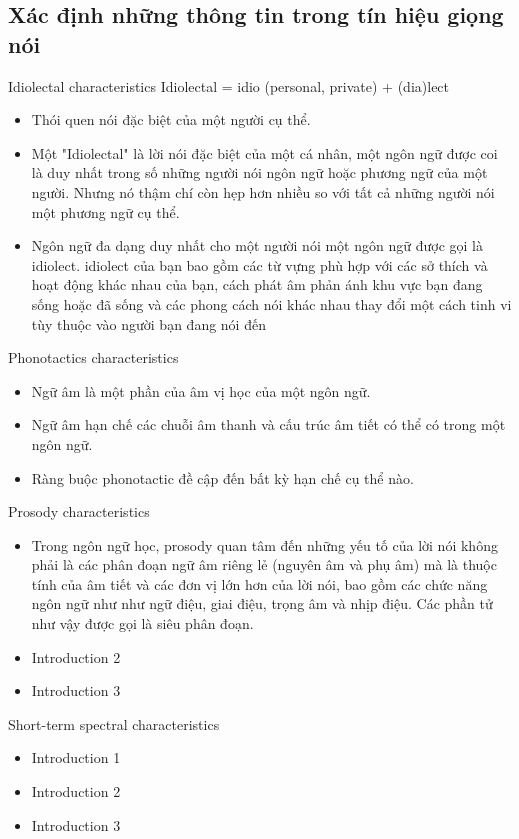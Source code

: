 \documentclass[11pt]{beamer}
\begin{document}
\subsection{Xác định những thông tin trong tín hiệu giọng nói}
\begin{frame}{Idiolectal characteristics}
	Idiolectal = idio (personal, private) + (dia)lect
	\begin{itemize}
		\item Thói quen nói đặc biệt của một người cụ thể.
		\item Một "Idiolectal" là lời nói đặc biệt của một cá nhân, một ngôn ngữ được coi là duy nhất trong số những người nói ngôn ngữ hoặc phương ngữ của một người. Nhưng nó thậm chí còn hẹp hơn nhiều so với tất cả những người nói một phương ngữ cụ thể.
		\item Ngôn ngữ đa dạng duy nhất cho một người nói một ngôn ngữ được gọi là idiolect. idiolect của bạn bao gồm các từ vựng phù hợp với các sở thích và hoạt động khác nhau của bạn, cách phát âm phản ánh khu vực bạn đang sống hoặc đã sống và các phong cách nói khác nhau thay đổi một cách tinh vi tùy thuộc vào người bạn đang nói đến
	\end{itemize}
\end{frame}
\begin{frame}{Phonotactics characteristics}
	\begin{itemize}
		\item Ngữ âm là một phần của âm vị học của một ngôn ngữ.
		\item Ngữ âm hạn chế các chuỗi âm thanh và cấu trúc âm tiết có thể có trong một ngôn ngữ.
		\item Ràng buộc phonotactic đề cập đến bất kỳ hạn chế cụ thể nào.
	\end{itemize}
\end{frame}
\begin{frame}{Prosody characteristics}
	\begin{itemize}
		\item Trong ngôn ngữ học, prosody quan tâm đến những yếu tố của lời nói không phải là các phân đoạn ngữ âm riêng lẻ (nguyên âm và phụ âm) mà là thuộc tính của âm tiết và các đơn vị lớn hơn của lời nói, bao gồm các chức năng ngôn ngữ như như ngữ điệu, giai điệu, trọng âm và nhịp điệu. Các phần tử như vậy được gọi là siêu phân đoạn.
		\item Introduction 2
		\item Introduction 3
	\end{itemize}
\end{frame}
\begin{frame}{Short-term spectral characteristics}
	\begin{itemize}
		\item Introduction 1
		\item Introduction 2
		\item Introduction 3
	\end{itemize}
\end{frame}
\end{document}
